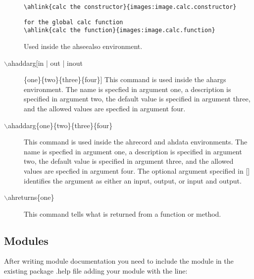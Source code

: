 \begin{description}
\begin{verbatim}
\ahlink{calc the constructor}{images:image.calc.constructor}
\end{verbatim}
\begin{verbatim}
for the global calc function
\ahlink{calc the function}{images:image.calc.function}
\end{verbatim}
Used inside the ahseealso environment.
%
\item[$\backslash$ahaddarg[in | out | inout] \{one\}\{two\}\{three\}\{four\}] This command is used inside
the ahargs environment.  The name is specfied in argument one, a description
is specified in argument two, the default value is specified in argument
three, and the allowed values are specfied in argument four.  
\item[$\backslash$ahaddarg\{one\}\{two\}\{three\}\{four\}] This command is
used inside the ahrecord and ahdata environments. The name is specfied in argument one, a description
is specified in argument two, the default value is specified in argument
three, and the allowed values are specfied in argument four.  The optional argument specified in []
identifies the argument as either an input, output, or input and output.
%
\item[$\backslash$ahreturns\{one\}] This command tells what is returned from a function
or method.
\end{description}


\subsection{Modules}
After writing module
documentation you need to include the module in the existing package .help
file adding your module with the line:\\
\begin{verbatim}

\end{verbatim}

